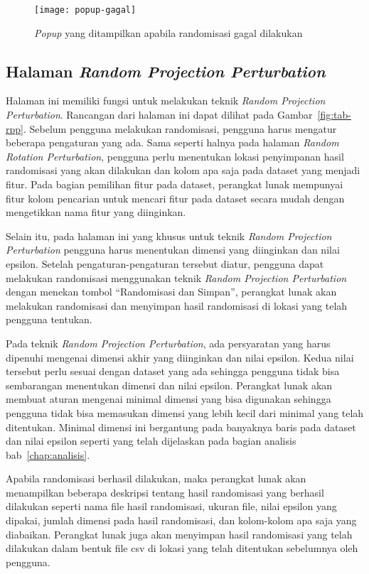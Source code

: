 \begin{figure}
	\centering
	\texttt{[image: popup-gagal]}
	\caption{\textit{Popup} yang ditampilkan apabila randomisasi gagal dilakukan}
	\label{fig:popup-gagal}
\end{figure}

\subsection{Halaman \textit{Random Projection Perturbation}}
\label{subsec:tabrpp}

Halaman ini memiliki fungsi untuk melakukan teknik \textit{Random Projection Perturbation}. Rancangan dari halaman ini dapat dilihat pada Gambar~\ref{fig:tab-rpp}. Sebelum pengguna melakukan randomisasi, pengguna harus mengatur beberapa pengaturan yang ada. Sama seperti halnya pada halaman \textit{Random Rotation Perturbation}, pengguna perlu menentukan lokasi penyimpanan hasil randomisasi yang akan dilakukan dan kolom apa saja pada dataset yang menjadi fitur. Pada bagian pemilihan fitur pada dataset, perangkat lunak mempunyai fitur kolom pencarian untuk mencari fitur pada dataset secara mudah dengan mengetikkan nama fitur yang diinginkan.

Selain itu, pada halaman ini yang khusus untuk teknik \textit{Random Projection Perturbation} pengguna harus menentukan dimensi yang diinginkan dan nilai epsilon. Setelah pengaturan-pengaturan tersebut diatur, pengguna dapat melakukan randomisasi menggunakan teknik \textit{Random Projection Perturbation} dengan menekan tombol \textquotedblleft Randomisasi dan Simpan\textquotedblright, perangkat lunak akan melakukan randomisasi dan menyimpan hasil randomisasi di lokasi yang telah pengguna tentukan. 

Pada teknik \textit{Random Projection Perturbation}, ada persyaratan yang harus dipenuhi mengenai dimensi akhir yang diinginkan dan nilai epsilon. Kedua nilai tersebut perlu sesuai dengan dataset yang ada sehingga pengguna tidak bisa sembarangan menentukan dimensi dan nilai epsilon. Perangkat lunak akan membuat aturan mengenai minimal dimensi yang bisa digunakan sehingga pengguna tidak bisa memasukan dimensi yang lebih kecil dari minimal yang telah ditentukan. Minimal dimensi ini bergantung pada banyaknya baris pada dataset dan nilai epsilon seperti yang telah dijelaskan pada bagian analisis bab~\ref{chap:analisis}.

Apabila randomisasi berhasil dilakukan, maka perangkat lunak akan menampilkan beberapa deskripsi tentang hasil randomisasi yang berhasil dilakukan seperti nama file hasil randomisasi, ukuran file, nilai epsilon yang dipakai, jumlah dimensi pada hasil randomisasi, dan kolom-kolom apa saja yang diabaikan. Perangkat lunak juga akan menyimpan hasil randomisasi yang telah dilakukan dalam bentuk file csv di lokasi yang telah ditentukan sebelumnya oleh pengguna.

